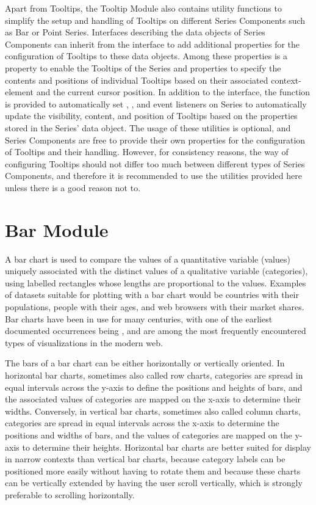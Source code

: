 Apart from Tooltips, the Tooltip Module also contains utility
functions to simplify the setup and handling of Tooltips on
different Series Components such as Bar or Point Series. Interfaces
describing the data objects of Series Components can inherit from the
 interface to add additional properties for
the configuration of Tooltips to these data objects. Among these
properties is a property to enable the Tooltips of the Series and
properties to specify the contents and positions of individual
Tooltips based on their associated context-element and the current
cursor position. In addition to the 
interface, the  function is
provided to automatically set , , and
 event listeners on Series to automatically update the
visibility, content, and position of Tooltips based on the
 properties stored in the Series' data
object. The usage of these utilities is optional, and Series
Components are free to provide their own properties for the
configuration of Tooltips and their handling. However, for
consistency reasons, the way of configuring Tooltips should not differ
too much between different types of Series Components, and therefore
it is recommended to use the utilities provided here unless there is a
good reason not to.





\section{Bar Module}

A bar chart is used to compare the values of a quantitative variable
(values) uniquely associated with the distinct values of a qualitative
variable (categories), using labelled rectangles whose lengths are
proportional to the values. Examples of datasets suitable for plotting
with a bar chart would be countries with their populations, people
with their ages, and web browsers with their market shares. Bar charts
have been in use for many centuries, with one of the earliest
documented occurrences being \textcite{CommercialAndPoliticalAtlas},
and are among the most frequently encountered types of visualizations
in the modern web.

The bars of a bar chart can be either horizontally or vertically
oriented. In horizontal bar charts, sometimes also called row charts,
categories are spread in equal intervals across the y-axis to define
the positions and heights of bars, and the associated values of
categories are mapped on the x-axis to determine their widths.
Conversely, in vertical bar charts, sometimes also called column
charts, categories are spread in equal intervals across the x-axis to
determine the positions and widths of bars, and the values of
categories are mapped on the y-axis to determine their heights.
Horizontal bar charts are better suited for display in narrow contexts
than vertical bar charts, because category labels can be positioned
more easily without having to rotate them and because these charts can
be vertically extended by having the user scroll vertically, which is
strongly preferable to scrolling horizontally.


